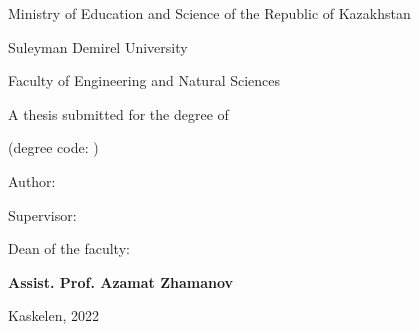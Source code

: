 \newpage
\pagestyle{empty}

\begin{center}
\large
Ministry of Education and Science of the Republic of Kazakhstan

Suleyman Demirel University

Faculty of Engineering and Natural Sciences

\vspace{2cm}
\textbf{\mytitle}

\vspace{1cm}
\large
A thesis submitted for the degree of

\mydegree

(degree code: \mydegreecode)

\vspace{2cm}
Author: \textbf{\myauthor}

\vspace{2cm}
Supervisor: \textbf{\mycoach}

\vspace{2cm}
Dean of the faculty:

\textbf{Assist. Prof. Azamat Zhamanov}


\vfill
Kaskelen, 2022
\end{center}
